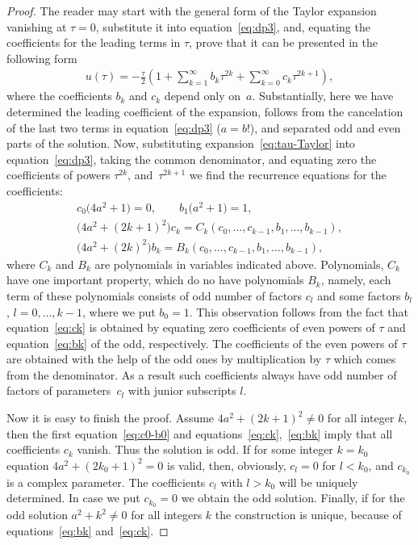 \documentclass[pdftex]{sigma}
\numberwithin{equation}{section}
\begin{document}
\begin{proof}The reader may start with the general form of the Taylor expansion vanishing at $\tau=0$, substitute it into
equation~\eqref{eq:dp3}, and, equating the coefficients for the leading terms in $\tau$, prove that it can
be presented in the following form
\begin{gather}\label{eq:tau-Taylor}
u(\tau)=-\frac{\tau}2\left(1+\sum\limits_{k=1}^{\infty}b_k\tau^{2k}+\sum\limits_{k=0}^{\infty}c_k\tau^{2k+1}\right),
\end{gather}
where the coefficients $b_k$ and $c_k$ depend only on~$a$. Substantially, here we have determined the leading coefficient of the expansion, follows from the cancelation of
the last two terms in equation~\eqref{eq:dp3} ($a=b$!), and separated odd and even parts of the solution.
Now, substituting expansion~\eqref{eq:tau-Taylor} into equation~\eqref{eq:dp3}, taking the common denominator,
and equating zero the coefficients of powers $\tau^{2k}$, and~$\tau^{2k+1}$
we find the recurrence equations for the coefficients:
\begin{gather}
 c_0\big(4a^2+1\big)=0,\qquad b_1\big(a^2+1\big)=1,\label{eq:c0-b0}\\
\big(4a^2+(2k+1)^2\big)c_k =C_k(c_0,\ldots,c_{k-1},b_1,\ldots,b_{k-1}),\label{eq:ck}\\
\big(4a^2+(2k)^2\big)b_k =B_k(c_0,\ldots,c_{k-1},b_1,\ldots,b_{k-1}),\label{eq:bk}
\end{gather}
where $C_k$ and $B_k$ are polynomials in variables indicated above. Polynomials, $C_k$ have one important property,
which do no have polynomials $B_k$, namely, each term of these polynomials consists of odd number of factors
$c_l$ and some factors $b_l$, $l=0,\ldots,k-1$, where we put $b_0=1$. This observation follows from the fact that
equation~\eqref{eq:ck} is obtained by equating zero coefficients of even powers of $\tau$ and equation~\eqref{eq:bk}
of the odd, respectively. The coefficients of the even powers of $\tau$ are obtained with the help of the odd ones
by multiplication by $\tau$ which comes from the denominator. As a result such coefficients always have odd
number of factors of parame\-ters~$c_l$ with junior subscripts $l$.

Now it is easy to finish the proof. Assume $4a^2+(2k+1)^2\neq0$ for all integer $k$, then the first
equation~\eqref{eq:c0-b0} and equations~\eqref{eq:ck},~\eqref{eq:bk} imply that all coefficients $c_k$ vanish.
Thus the solution is odd. If for some integer $k=k_0$ equation $4a^2+(2k_0+1)^2=0$ is valid, then, obviously,
$c_l=0$ for $l<k_0$, and $c_{k_0}$ is a complex parameter. The coefficients $c_l$ with $l>k_0$ will be uniquely
determined. In case we put $c_{k_0}=0$ we obtain the odd solution. Finally, if for the odd solution
$a^2+k^2\neq0$ for all integers $k$ the construction is unique, because of equations~\eqref{eq:bk} and~\eqref{eq:ck}.
\end{proof}
\end{document}
